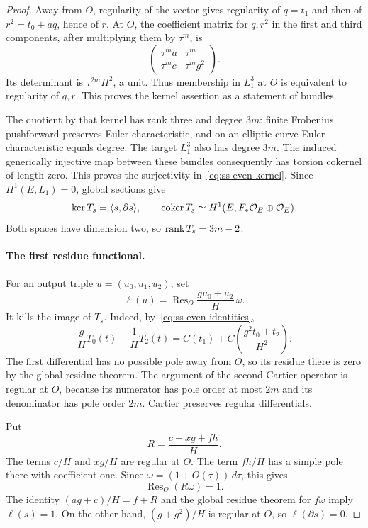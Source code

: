 \begin{proof}
Away from $O$, regularity of the vector gives regularity of $q=t_1$ and then of $r^2=t_0+aq$, hence of $r$. At $O$, the coefficient matrix for $q,r^2$ in the first and third components, after multiplying them by $\tau^m$, is
\[
 \begin{pmatrix}
 \tau^ma&\tau^m\\
 \tau^mc&\tau^mg^2
 \end{pmatrix}.
\]
Its determinant is $\tau^{2m}H^2$, a unit. Thus membership in $L_1^3$ at $O$ is equivalent to regularity of $q,r$. This proves the kernel assertion as a statement of bundles.

The quotient by that kernel has rank three and degree $3m$: finite Frobenius pushforward preserves Euler characteristic, and on an elliptic curve Euler characteristic equals degree. The target $L_1^3$ also has degree $3m$. The induced generically injective map between these bundles consequently has torsion cokernel of length zero. This proves the surjectivity in~\eqref{eq:ss-even-kernel}.
Since $H^1(E,L_1)=0$, global sections give
\begin{equation}\label{eq:ss-even-global-kernel}
 \ker T_s=\langle s,\partial s\rangle,\qquad
 \operatorname{coker}T_s
       \simeq H^1(E,F_*\mathcal O_E\oplus\mathcal O_E).
\end{equation}
Both spaces have dimension two, so $\operatorname{rank} T_s=3m-2$.

\paragraph{The first residue functional.}
For an output triple $u=(u_0,u_1,u_2)$, set
\[
 \ell(u)=\operatorname{Res}_O
                \frac{gu_0+u_2}{H}\,\omega.
\]
It kills the image of $T_s$. Indeed, by~\eqref{eq:ss-even-identities},
\[
 \frac{g}{H}T_0(t)+\frac1H T_2(t)
        =C(t_1)+C\!\left(\frac{g^2t_0+t_2}{H^2}\right).
\]
The first differential has no possible pole away from $O$, so its residue there is zero by the global residue theorem. The argument of the second Cartier operator is regular at $O$, because its numerator has pole order at most $2m$ and its denominator has pole order $2m$. Cartier preserves regular differentials.

Put
\[
                       R=\frac{c+xg+fh}{H}.
\]
The terms $c/H$ and $xg/H$ are regular at $O$. The term $fh/H$ has a simple pole there with coefficient one. Since $\omega=(1+O(\tau))\,d\tau$, this gives
\begin{equation}\label{eq:ss-even-residue}
                   \operatorname{Res}_O(R\omega)=1.
\end{equation}
The identity $(ag+c)/H=f+R$ and the global residue theorem for $f\omega$ imply $\ell(s)=1$. On the other hand, $(g+g^2)/H$ is regular at $O$, so $\ell(\partial s)=0$.


\end{proof}
